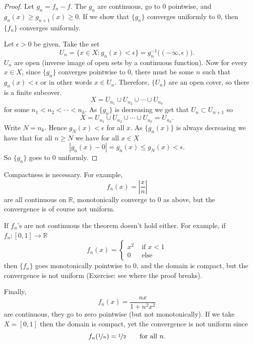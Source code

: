 \documentclass[12pt]{book}
\newcommand{\abs}[1]{\left\lvert {#1} \right\rvert}
\newcommand{\R}{{\mathbb{R}}}
\theoremstyle{plain}
\theoremstyle{remark}
\theoremstyle{definition}
\theoremstyle{exercise}
\theoremstyle{example}
\begin{document}
\begin{proof}
Let $g_n = f_n-f$.  The $g_n$ are continuous, go to 0 pointwise, and
$g_n(x) \geq g_{n+1}(x) \geq 0$.  If we show that $\{ g_n \}$ converges
uniformly to 0, then $\{ f_n \}$ converges uniformly.

Let $\epsilon > 0$ be given.
Take the set
\begin{equation*}
U_n = \{ x \in X : g_n(x) < \epsilon \} =
g_n^{-1}\bigl((-\infty,\epsilon)\bigr).
\end{equation*}
$U_n$ are open (inverse image of open sets by a continuous function).  Now for every $x \in X$,
since $\{g_n\}$ converges pointwise to 0, there must be some $n$ such that
$g_n(x) < \epsilon$ or in other words $x \in U_n$.  Therefore, $\{ U_n \}$
are an open cover, so there is a finite subcover.
$$
X = U_{n_1} \cup U_{n_2} \cup \cdots \cup U_{n_k}
$$
for some $n_1 < n_2 < \cdots < n_k$.  As $\{g_n\}$ is decreasing
we get that $U_n \subset U_{n+1}$ so
$$
X = U_{n_1} \cup U_{n_2} \cup \cdots \cup U_{n_k} = U_{n_k} .
$$
Write $N = n_k$.  Hence
$g_N(x) < \epsilon$ for all $x$.  As $\{ g_n(x) \}$ is always
decreasing we have that for all $n \geq N$ we have for all $x \in X$
\begin{equation*}
\abs{g_n(x) - 0}
=
g_n(x) \leq g_N(x) < \epsilon .
\end{equation*}
So $\{ g_n \}$ goes to 0 uniformly.
\end{proof}

Compactness is necessary.  For example,
\begin{equation*}
f_n(x) = \abs{\frac{x}{n}}
\end{equation*}
are all continuous on $\R$, monotonically converge to 0 as above, but
the convergence is of course not uniform.

If $f_n$'s are not continuous the theorem doesn't hold either.  For example,
if $f_n \colon [0,1] \to \R$
\begin{equation*}
f_n(x) = \begin{cases}
x^2 & \text{ if $x < 1$}\\
0 & \text{ else}
\end{cases}
\end{equation*}
then $\{f_n\}$ goes monotonically pointwise to 0, and the domain is compact, but the convergence is not
uniform (Exercise: see where the proof breaks).

Finally,
\begin{equation*}
f_n(x) = \frac{nx}{1+n^2x^2}
\end{equation*}
are continuous, they go to zero pointwise (but not monotonically).  If we
take $X=[0,1]$ then the domain is compact, yet the convergence is not uniform
since
\begin{equation*}
f_n(\nicefrac{1}{n}) = \nicefrac{1}{2} \qquad \text{for all $n$.}
\end{equation*}
\end{document}

